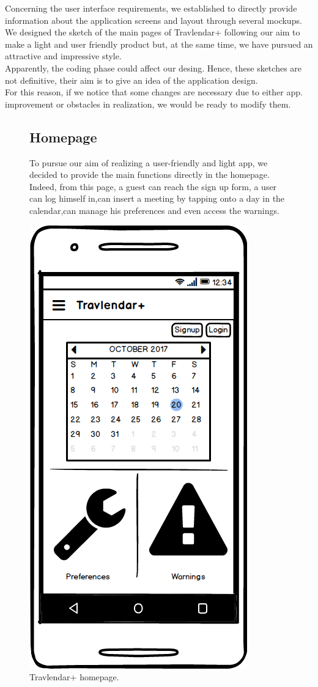 
	\begin{flushleft}
		Concerning the user interface requirements, we established to directly provide information about the application screens and layout through several mockups. \\
		We designed the sketch of the main pages of Travlendar+ following our aim to make a light and user friendly product but, at the same time, we have pursued an attractive and impressive style. \\
		Apparently, the coding phase could affect our desing. Hence, these sketches are not definitive, their aim is to give an idea of the application design. \\
		For this reason, if we notice that some changes are necessary due to either app. improvement or obstacles in realization, we would be ready to modify them. 
	\end{flushleft}
\clearpage

	\begin{figure}
			\begin{flushleft}
			\subsection{Homepage}
			To pursue our aim of realizing a user-friendly and light app, we decided to provide the main functions directly in the homepage. Indeed, from this page, a guest can reach the sign up form, a user can log himself in,can insert a meeting by tapping onto a day in the calendar,can manage his preferences and even access the warnings. \\ 
		\end{flushleft}
		\centering
		\includegraphics[width=0.6\linewidth]{mockups/Homepage}
		\caption{Travlendar+ homepage.  
		}
	\label{fig:homepage}
	\end{figure}

